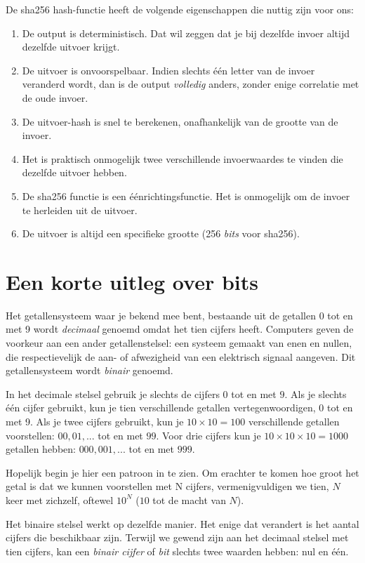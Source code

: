 De sha256 hash-functie heeft de volgende eigenschappen die nuttig zijn voor ons:

\begin{enumerate}
    \item De output is deterministisch. Dat wil zeggen dat je bij dezelfde invoer altijd dezelfde uitvoer krijgt.
    \item De uitvoer is onvoorspelbaar. Indien slechts één letter van de invoer veranderd wordt, dan is de output \textit{volledig} anders, zonder enige correlatie met de oude invoer.
    \item De uitvoer-hash is snel te berekenen, onafhankelijk van de grootte van de invoer.
    \item Het is praktisch onmogelijk twee verschillende invoerwaardes te vinden die dezelfde uitvoer hebben.
    \item De sha256 functie is een éénrichtingsfunctie. Het is onmogelijk om de invoer te herleiden uit de uitvoer.
    \item De uitvoer is altijd een specifieke grootte (256 \textit{bits} voor sha256).
\end{enumerate}

\section{Een korte uitleg over bits}

Het getallensysteem waar je bekend mee bent, bestaande uit de getallen 0 tot en met 9 wordt \textit{decimaal} genoemd omdat het tien cijfers heeft. Computers geven de voorkeur aan een ander getallenstelsel: een systeem gemaakt van enen en nullen, die respectievelijk de aan- of afwezigheid van een elektrisch signaal aangeven. Dit getallensysteem wordt \textit{binair} genoemd.

In het decimale stelsel gebruik je slechts de cijfers $0$ tot en met $9$. Als je slechts één cijfer gebruikt, kun je tien verschillende getallen vertegenwoordigen, 0 tot en met 9. Als je twee cijfers gebruikt, kun je $10 \times 10 = 100$ verschillende getallen voorstellen: $00, 01,...$ tot en met $99$. Voor drie cijfers kun je $10 \times 10 \times 10 = 1000$ getallen hebben: $000, 001,...$ tot en met $999$.

Hopelijk begin je hier een patroon in te zien. Om erachter te komen hoe groot het getal is dat we kunnen voorstellen met N cijfers, vermenigvuldigen we tien, $N$ keer met zichzelf, oftewel $10^N$ ($10$ tot de macht van $N$).

Het binaire stelsel werkt op dezelfde manier. Het enige dat verandert is het aantal cijfers die beschikbaar zijn. Terwijl we gewend zijn aan het decimaal stelsel met tien cijfers, kan een \textit{binair cijfer} of \textit{bit} slechts twee waarden hebben: nul en één.

